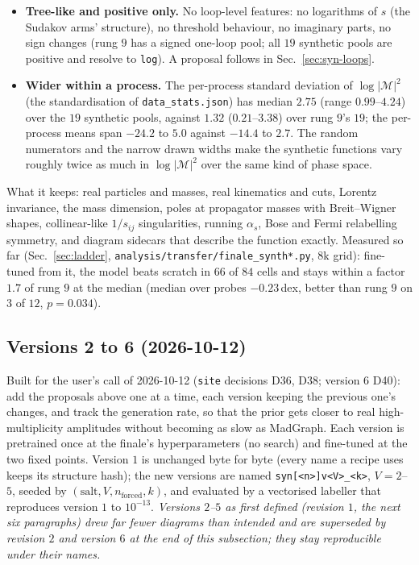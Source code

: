 \documentclass[11pt]{article}
\newcommand{\code}[1]{\texttt{#1}}
\begin{document}
\begin{itemize}
  \item \textbf{Tree-like and positive only.} No loop-level features: no logarithms of $s$ (the Sudakov arms'
    structure), no threshold behaviour, no imaginary parts, no sign changes (rung $9$ has a signed one-loop pool; all
    $19$ synthetic pools are positive and resolve to \code{log}). A proposal follows in Sec.~\ref{sec:syn-loops}.
  \item \textbf{Wider within a process.} The per-process standard deviation of $\log|\mathcal M|^2$ (the
    standardisation of \code{data\_stats.json}) has median $2.75$ (range $0.99$--$4.24$) over the $19$ synthetic pools,
    against $1.32$ ($0.21$--$3.38$) over rung $9$'s $19$; the per-process means span $-24.2$ to $5.0$ against $-14.4$ to
    $2.7$. The random numerators and the narrow drawn widths make the synthetic functions vary roughly twice as much in
    $\log|\mathcal M|^2$ over the same kind of phase space.
\end{itemize}
What it keeps: real particles and masses, real kinematics and cuts, Lorentz invariance, the mass dimension, poles at
propagator masses with Breit--Wigner shapes, collinear-like $1/s_{ij}$ singularities, running $\alpha_s$, Bose and Fermi
relabelling symmetry, and diagram sidecars that describe the function exactly.
Measured so far (Sec.~\ref{sec:ladder}, \code{analysis/transfer/finale\_synth*.py}, $8$k grid): fine-tuned from
it, the model beats scratch in $66$ of $84$ cells and stays within a factor $1.7$ of rung $9$ at the median (median over
probes $-0.23$\,dex, better than rung $9$ on $3$ of $12$, $p=0.034$).

\subsection{Versions 2 to 6 (2026-10-12)}\label{sec:syn-versions}
Built for the user's call of 2026-10-12 (\code{site} decisions D36, D38; version $6$ D40): add the proposals above one at a time, each
version keeping the previous one's changes, and track the generation rate, so that the prior gets closer to real
high-multiplicity amplitudes without becoming as slow as MadGraph. Each version is pretrained once at the finale's
hyperparameters (no search) and fine-tuned at the two fixed points. Version $1$ is unchanged byte for byte (every name a
recipe uses keeps its structure hash); the new versions are named \code{syn[<n>]v<V>\_<k>}, $V=2$--$5$, seeded by
$(\text{salt},V,n_\text{forced},k)$, and evaluated by a vectorised labeller that reproduces version $1$ to $10^{-13}$.
\emph{Versions $2$--$5$ as first defined (revision $1$, the next six paragraphs) drew far fewer diagrams than intended
and are superseded by revision $2$ and version $6$ at the end of this subsection; they stay reproducible under their
names.}
\end{document}
